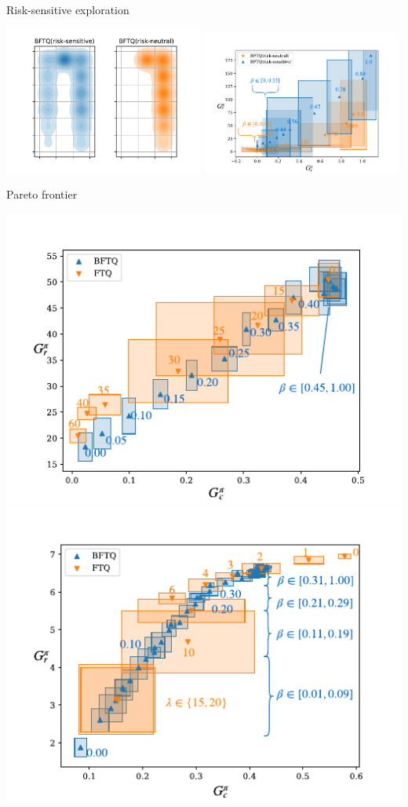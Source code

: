 \documentclass[a0paper,portrait,fontscale=0.355, margin=2cm]{baposter}
\begin{document}
\begin{poster}
{\begin{minipage}{0.49\textwidth}
\centering
Risk-sensitive exploration

\includegraphics[width=0.49\textwidth]{../source/img/corridors_densities.pdf}
\includegraphics[page=1, width=0.49\textwidth]{../source/img/corridors}
\end{minipage}
\begin{minipage}{0.5\textwidth}
\centering
Pareto frontier

\includegraphics[width=0.49\linewidth]{../source/img/slot-filling}
\includegraphics[width=0.49\linewidth]{../source/img/highway}
\end{minipage}
}




\end{poster}
\end{document}
